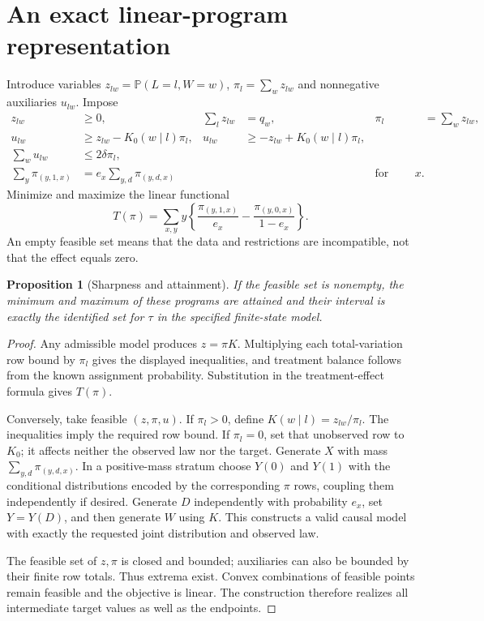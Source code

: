 \documentclass[11pt]{article}
\newtheorem{proposition}{Proposition}
\newcommand{\Prb}{\mathbb P}
\begin{document}
\section*{An exact linear-program representation}
Introduce variables $z_{lw}=\Prb(L=l,W=w)$, $\pi_l=\sum_wz_{lw}$ and nonnegative auxiliaries $u_{lw}$. Impose
\begin{align*}
 z_{lw}&\geq0,&\sum_lz_{lw}&=q_w,&\pi_l&=\sum_wz_{lw},\\
 u_{lw}&\geq z_{lw}-K_0(w\mid l)\pi_l,&
 u_{lw}&\geq -z_{lw}+K_0(w\mid l)\pi_l,\\
 \sum_wu_{lw}&\leq2\delta\pi_l,&&&\\
 \sum_y\pi_{(y,1,x)}&=e_x\sum_{y,d}\pi_{(y,d,x)}&&&\text{for every }x.
\end{align*}
Minimize and maximize the linear functional
\[
 T(\pi)=\sum_{x,y}y\left\{\frac{\pi_{(y,1,x)}}{e_x}
                   -\frac{\pi_{(y,0,x)}}{1-e_x}\right\}.
\]
An empty feasible set means that the data and restrictions are incompatible, not that the effect equals zero.

\begin{proposition}[Sharpness and attainment]
If the feasible set is nonempty, the minimum and maximum of these programs are attained and their interval is exactly the identified set for $\tau$ in the specified finite-state model.
\end{proposition}
\begin{proof}
Any admissible model produces $z=\pi K$. Multiplying each total-variation row bound by $\pi_l$ gives the displayed inequalities, and treatment balance follows from the known assignment probability. Substitution in the treatment-effect formula gives $T(\pi)$.

Conversely, take feasible $(z,\pi,u)$. If $\pi_l>0$, define $K(w\mid l)=z_{lw}/\pi_l$. The inequalities imply the required row bound. If $\pi_l=0$, set that unobserved row to $K_0$; it affects neither the observed law nor the target. Generate $X$ with mass $\sum_{y,d}\pi_{(y,d,x)}$. In a positive-mass stratum choose $Y(0)$ and $Y(1)$ with the conditional distributions encoded by the corresponding $\pi$ rows, coupling them independently if desired. Generate $D$ independently with probability $e_x$, set $Y=Y(D)$, and then generate $W$ using $K$. This constructs a valid causal model with exactly the requested joint distribution and observed law.

The feasible set of $z,\pi$ is closed and bounded; auxiliaries can also be bounded by their finite row totals. Thus extrema exist. Convex combinations of feasible points remain feasible and the objective is linear. The construction therefore realizes all intermediate target values as well as the endpoints.
\end{proof}
\end{document}
